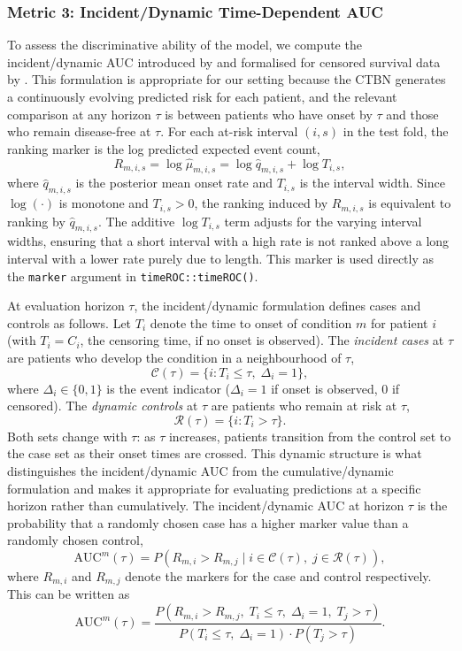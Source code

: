 \documentclass[12pt]{article}
\begin{document}
\subsubsection{Metric 3: Incident/Dynamic Time-Dependent AUC}

To assess the discriminative ability of the model, we compute the incident/dynamic AUC introduced by \citet{Pepe1991} and formalised for censored survival data by \citet{BlancheCommengesJacqmin-Gadda2013}. This formulation is appropriate for our setting because the CTBN generates a continuously evolving predicted risk for each patient, and the relevant comparison at any horizon $\tau$ is between patients who have onset by $\tau$ and those who remain disease-free at $\tau$. For each at-risk interval $(i,s)$ in the test fold, the ranking marker is the log predicted expected event count,
\[
R_{m,i,s} = \log\hat{\mu}_{m,i,s} = \log\hat{q}_{m,i,s} + \log T_{i,s},
\]
where $\hat{q}_{m,i,s}$ is the posterior mean onset rate and $T_{i,s}$ is the interval width. Since $\log(\cdot)$ is monotone and $T_{i,s} > 0$, the ranking induced by $R_{m,i,s}$ is equivalent to ranking by $\hat{q}_{m,i,s}$. The additive $\log T_{i,s}$ term adjusts for the varying interval widths, ensuring that a short interval with a high rate is not ranked above a long interval with a lower rate purely due to length. This marker is used directly as the \texttt{marker} argument in \texttt{timeROC::timeROC()}.

At evaluation horizon $\tau$, the incident/dynamic formulation defines cases and controls as follows. Let $T_i$ denote the time to onset of condition $m$ for patient $i$ (with $T_i = C_i$, the censoring time, if no onset is observed). The \emph{incident cases} at $\tau$ are patients who develop the condition in a neighbourhood of $\tau$,
\[
\mathcal{C}(\tau) = \{i : T_i \leq \tau,\; \Delta_i = 1\},
\]
where $\Delta_i \in \{0,1\}$ is the event indicator ($\Delta_i = 1$ if onset is observed, 0 if censored). The \emph{dynamic controls} at $\tau$ are patients who remain at risk at $\tau$,
\[
\mathcal{R}(\tau) = \{i : T_i > \tau\}.
\]
Both sets change with $\tau$: as $\tau$ increases, patients transition from the control set to the case set as their onset times are crossed. This dynamic structure is what distinguishes the incident/dynamic AUC from the cumulative/dynamic formulation and makes it appropriate for evaluating predictions at a specific horizon rather than cumulatively. The incident/dynamic AUC at horizon $\tau$ is the probability that a randomly chosen case has a higher marker value than a randomly chosen control,
\[
\mathrm{AUC}^m(\tau) = P\!\left(R_{m,i} > R_{m,j} \;\Big|\; i \in \mathcal{C}(\tau),\; j \in \mathcal{R}(\tau)\right),
\]
where $R_{m,i}$ and $R_{m,j}$ denote the markers for the case and control respectively. This can be written as
\[
\mathrm{AUC}^m(\tau) = \frac{P\!\left(R_{m,i} > R_{m,j},\; T_i \leq \tau,\; \Delta_i = 1,\; T_j > \tau\right)}{P\!\left(T_i \leq \tau,\; \Delta_i = 1\right) \cdot P\!\left(T_j > \tau\right)}.
\]
\end{document}
